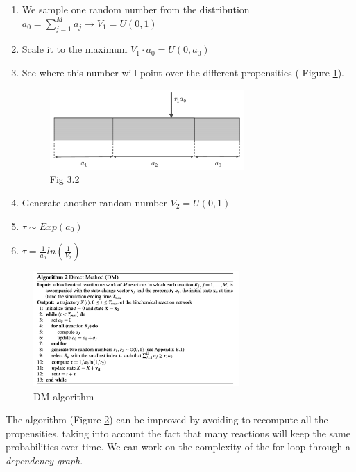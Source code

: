\begin{enumerate}
  \def\labelenumi{\arabic{enumi}.}
  \item We sample one random number from the distribution $a_0 = \sum_{j=1}^{M}{a_j}\rightarrow V_1=U(0,1)$
  \item Scale it to the maximum $V_1 \cdot a_0 =U(0,a_0)$
  \item See where this number will point over the different propensities ( Figure \ref{fig:boundaries}).

  \begin{figure}
    \centering
    \includegraphics[width=0.7\textwidth]{boundaries.png}
    \caption{Fig 3.2}
    \label{fig:boundaries}
  \end{figure}

  \item Generate another random number $V_2 =U(0,1)$ \item $\tau \sim Exp(a_0)$ \item $\tau = \frac{1}{a_0}ln(\frac{1}{V_2})$
\end{enumerate}


 \begin{figure}
    \centering
    \includegraphics[width=0.7\textwidth]{direct_method.png}
    \caption{DM algorithm}
    \label{fig:DM_algo}
  \end{figure}
 
 \noindent
The algorithm (Figure \ref{fig:DM_algo}) can be improved by avoiding to recompute all the propensities, taking into account the fact that many reactions will keep the same probabilities over time.
We can work on the complexity of the for loop through a \emph{dependency graph}.

